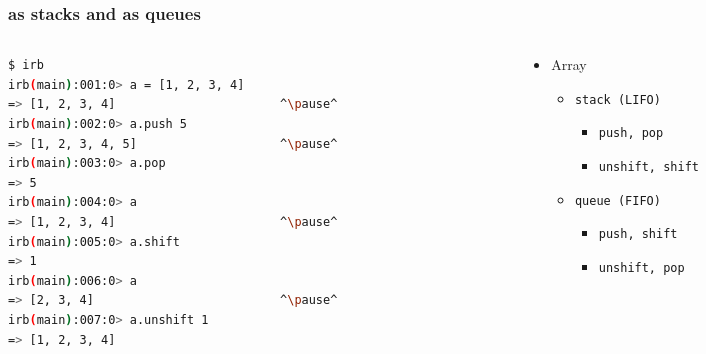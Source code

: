 \begin{frame}[fragile]\frametitle{as stacks and as queues}

\begin{columns}[c] 

\begin{column}{7cm}
\begin{lstlisting}[language=bash, escapechar={^}]
$ irb
irb(main):001:0> a = [1, 2, 3, 4]
=> [1, 2, 3, 4]                       ^\pause^
irb(main):002:0> a.push 5
=> [1, 2, 3, 4, 5]                    ^\pause^
irb(main):003:0> a.pop
=> 5
irb(main):004:0> a
=> [1, 2, 3, 4]                       ^\pause^
irb(main):005:0> a.shift
=> 1                                  
irb(main):006:0> a
=> [2, 3, 4]                          ^\pause^
irb(main):007:0> a.unshift 1
=> [1, 2, 3, 4]
\end{lstlisting}
\end{column}

\pause

\begin{column}{4cm}
\begin{itemize}

\item Array
\begin{itemize}

\item \texttt{stack (LIFO)}
\begin{itemize}
\item \texttt{push, pop}
\item \texttt{unshift, shift}
\end{itemize}

\item \texttt{queue (FIFO)}
\begin{itemize}
\item \texttt{push, shift}
\item \texttt{unshift, pop}
\end{itemize}

\end{itemize}

\end{itemize}
\end{column}

\end{columns}

\end{frame}




